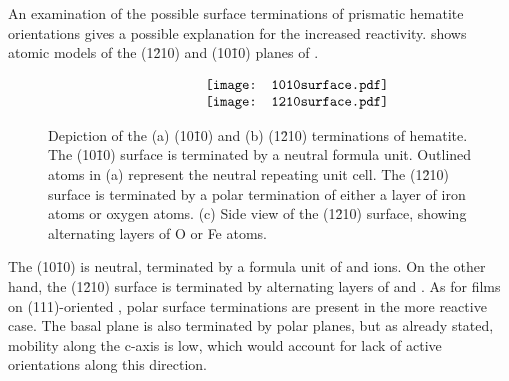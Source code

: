 An examination of the possible surface terminations of prismatic hematite orientations gives a possible explanation for the increased reactivity.  shows atomic models of the (1\={2}10) and (10\={1}0) planes of .
\begin{figure}[htbp]
\begin{center}$
\begin{array}{cc}
\centerline{\texttt{[image: 1010surface.pdf]}} \\ 
\centerline{\texttt{[image: 1210surface.pdf]}}
\end{array}$
\caption[Depiction of the (10\={1}0) and (1\={2}10) terminations of hematite]{Depiction of the (a) (10\={1}0) and (b) (1\={2}10) terminations of hematite. The (10\={1}0) surface is terminated by a neutral formula unit. Outlined atoms in (a) represent the neutral repeating  unit cell. The (1\={2}10) surface is terminated by a polar termination of either a layer of iron atoms or oxygen atoms. (c) Side view of the (1\={2}10) surface, showing alternating layers of O or Fe atoms.}
\label{fig:fe2o3terminations}
\end{center}
\end{figure}
The (10\={1}0) is neutral, terminated by a formula unit of  and  ions. On the other hand, the (1\={2}10) surface is terminated by alternating layers of  and . As for  films on (111)-oriented , polar surface terminations are present in the more reactive case. The basal plane is also terminated by polar planes, but as already stated, mobility along the c-axis is low, which would account for lack of active orientations along this direction.

